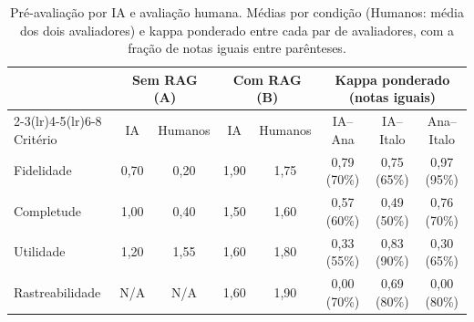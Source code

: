 \documentclass[11pt,a4paper]{article}
\begin{document}
\begin{table}[!htb]
\centering\footnotesize
\setlength{\tabcolsep}{4pt}
\caption{Pré-avaliação por IA e avaliação humana. Médias por condição (Humanos: média dos dois avaliadores) e kappa ponderado entre cada par de avaliadores, com a fração de notas iguais entre parênteses.}
\label{tab:iahumana}
\begin{tabular}{lccccccc}
\toprule
 & \multicolumn{2}{c}{Sem RAG (A)} & \multicolumn{2}{c}{Com RAG (B)} & \multicolumn{3}{c}{Kappa ponderado (notas iguais)} \\
\cmidrule(lr){2-3}\cmidrule(lr){4-5}\cmidrule(lr){6-8}
Critério & IA & Humanos & IA & Humanos & IA--Ana & IA--Italo & Ana--Italo \\
\midrule
Fidelidade & 0,70 & 0,20 & 1,90 & 1,75 & 0,79 (70\%) & 0,75 (65\%) & 0,97 (95\%) \\
Completude & 1,00 & 0,40 & 1,50 & 1,60 & 0,57 (60\%) & 0,49 (50\%) & 0,76 (70\%) \\
Utilidade & 1,20 & 1,55 & 1,60 & 1,80 & 0,33 (55\%) & 0,83 (90\%) & 0,30 (65\%) \\
Rastreabilidade & N/A & N/A & 1,60 & 1,90 & 0,00 (70\%) & 0,69 (80\%) & 0,00 (80\%) \\
\bottomrule
\end{tabular}
\end{table}
\end{document}
